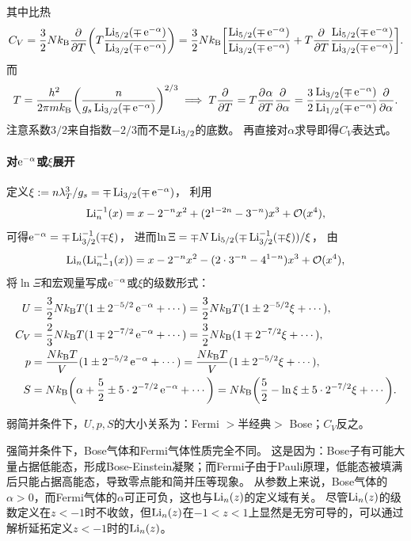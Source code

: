 其中比热
\[
	C_V=\frac32N\kB\pp T\biggkh{T\frac{\Li_{5/2}(\mp\e{-\alpha})}{\Li_{3/2}(\mp\e{-\alpha})}}=\frac32N\kB\biggfkh{\frac{\Li_{5/2}(\mp\e{-\alpha})}{\Li_{3/2}(\mp\e{-\alpha})}+T\pp T\frac{\Li_{5/2}(\mp\e{-\alpha})}{\Li_{3/2}(\mp\e{-\alpha})}}.
\]
而
\[
	T=\frac{h^2}{2\pi m\kB}\biggkh{\frac{n}{g_s\Li_{3/2}(\mp\e{-\alpha})}}^{2/3}
	\implies
	T\pp T=T\pv\alpha T\pp\alpha=\frac32\frac{\Li_{3/2}(\mp\e{-\alpha})}{\Li_{1/2}(\mp\e{-\alpha})}\pp\alpha.
\]
注意系数$3/2$来自指数$-2/3$而不是$\Li_{3/2}$的底数。
再直接对$\alpha$求导即得$C_V$表达式。

\paragraph{对$\e{-\alpha}$或$\xi$展开}

定义$\xi:=n\lambda_T^3/g_s=\mp\Li_{3/2}(\mp\e{-\alpha})$，
利用
\[
	\Li_n^{-1}(x)=x-2^{-n}x^2+(2^{1-2n}-3^{-n})x^3+\bigo(x^4),
\]
可得$\e{-\alpha}=\mp\Li_{3/2}^{-1}(\mp\xi)$，
进而$\ln\Xi=\mp N\Li_{5/2}(\mp\Li_{3/2}^{-1}(\mp\xi))/\xi$，
由
\[
	\Li_n(\Li_{n-1}^{-1}(x))=x-2^{-n}x^2-(2\cdot 3^{-n}-4^{1-n})x^3+\bigo(x^4),
\]
将$\ln\Xi$和宏观量写成$\e{-\alpha}$或$\xi$的级数形式：
\begin{subequations}
	\begin{align}
		U&=\frac32N\kB T(1\pm 2^{-5/2}\e{-\alpha}+\cdots)=\frac32N\kB T(1\pm 2^{-5/2}\xi+\cdots),\\
		C_V&=\frac23N\kB T(1\mp 2^{-7/2}\e{-\alpha}+\cdots)=\frac32N\kB(1\mp 2^{-7/2}\xi+\cdots),\\
		p&=\frac{N\kB T}V(1\pm 2^{-5/2}\e{-\alpha}+\cdots)=\frac{N\kB T}V(1\pm 2^{-5/2}\xi+\cdots),\\
		S&=N\kB\biggkh{\alpha+\frac52\pm 5\cdot2^{-7/2}\e{-\alpha}+\cdots}=N\kB\biggkh{\frac52-\ln\xi\pm 5\cdot 2^{-7/2}\xi+\cdots}.
	\end{align}
\end{subequations}

\begin{corollary}
	弱简并条件下，$U,p,S$的大小关系为：Fermi $>$半经典$>$ Bose；$C_V$反之。
\end{corollary}

\begin{remark}
	强简并条件下，Bose气体和Fermi气体性质完全不同。
	这是因为：Bose子有可能大量占据低能态，形成Bose-Einstein凝聚；而Fermi子由于Pauli原理，低能态被填满后只能占据高能态，导致零点能和简并压等现象。
	从参数上来说，Bose气体的$\alpha>0$，而Fermi气体的$\alpha$可正可负，这也与$\Li_n(z)$的定义域有关。
	尽管$\Li_n(z)$的级数定义在$z<-1$时不收敛，但$\Li_n(z)$在$-1<z<1$上显然是无穷可导的，可以通过解析延拓定义$z<-1$时的$\Li_n(z)$。
\end{remark}

